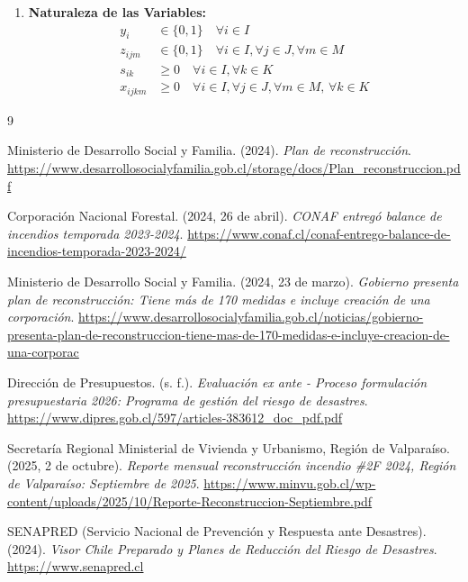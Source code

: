 \documentclass[letterpaper]{article}
\begin{document}
\begin{flushleft}
\begin{enumerate}
    \item \textbf{Naturaleza de las Variables:}\\
    \begin{align*}
        y_i &\in \{0, 1\} \quad \forall i \in I \\
        z_{ijm} &\in \{0, 1\} \quad \forall i \in I, \forall j \in J, \forall m \in M \\
        s_{ik} &\geq 0 \quad \forall i \in I, \forall k \in K \\
        x_{ijkm} &\geq 0 \quad \forall i \in I, \forall j \in J, \forall m \in M \text{, } \forall k \in K 
    \end{align*}
\end{enumerate}

\newpage
\begin{thebibliography}{9}

Ministerio de Desarrollo Social y Familia. (2024). \textit{Plan de reconstrucci\'on}. \url{https://www.desarrollosocialyfamilia.gob.cl/storage/docs/Plan_reconstruccion.pdf}

Corporaci\'on Nacional Forestal. (2024, 26 de abril). \textit{CONAF entreg\'o balance de incendios temporada 2023-2024}. \url{https://www.conaf.cl/conaf-entrego-balance-de-incendios-temporada-2023-2024/}

Ministerio de Desarrollo Social y Familia. (2024, 23 de marzo). \textit{Gobierno presenta plan de reconstrucci\'on: Tiene m\'as de 170 medidas e incluye creaci\'on de una corporaci\'on}. \url{https://www.desarrollosocialyfamilia.gob.cl/noticias/gobierno-presenta-plan-de-reconstruccion-tiene-mas-de-170-medidas-e-incluye-creacion-de-una-corporac}

Direcci\'on de Presupuestos. (s. f.). \textit{Evaluaci\'on ex ante - Proceso formulaci\'on presupuestaria 2026: Programa de gesti\'on del riesgo de desastres}. \url{https://www.dipres.gob.cl/597/articles-383612_doc_pdf.pdf}

Secretar\'ia Regional Ministerial de Vivienda y Urbanismo, Regi\'on de Valpara\'iso. (2025, 2 de octubre). \textit{Reporte mensual reconstrucci\'on incendio \#2F 2024, Regi\'on de Valpara\'iso: Septiembre de 2025}. \url{https://www.minvu.gob.cl/wp-content/uploads/2025/10/Reporte-Reconstruccion-Septiembre.pdf}

SENAPRED (Servicio Nacional de Prevenci\'on y Respuesta ante Desastres). (2024). \textit{Visor Chile Preparado y Planes de Reducci\'on del Riesgo de Desastres}. \url{https://www.senapred.cl}

\end{thebibliography}

\end{flushleft}
\end{document}
